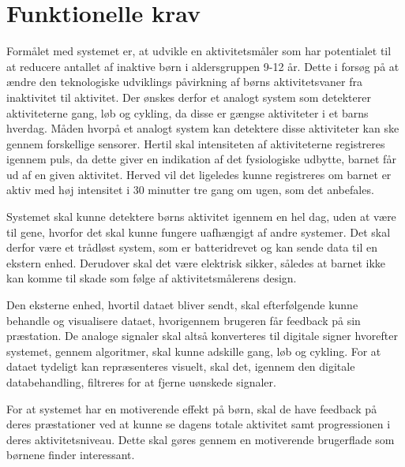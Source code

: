 \section{Funktionelle krav}



Formålet med systemet er, at udvikle en aktivitetsmåler som har potentialet til at reducere antallet af inaktive børn i aldersgruppen 9-12 år. Dette i forsøg på at ændre den teknologiske udviklings påvirkning af børns aktivitetsvaner fra inaktivitet til aktivitet.
Der ønskes derfor et analogt system som detekterer aktiviteterne gang, løb og cykling, da disse er gængse aktiviteter i et barns hverdag. Måden hvorpå et analogt system kan detektere disse aktiviteter kan ske gennem forskellige sensorer.
Hertil skal intensiteten af aktiviteterne registreres igennem puls, da dette giver en indikation af det fysiologiske udbytte, barnet får ud af en given aktivitet. Herved vil det ligeledes kunne registreres om barnet er aktiv med høj intensitet i 30 minutter tre gang om ugen, som det anbefales.

Systemet skal kunne detektere børns aktivitet igennem en hel dag, uden at være til gene, hvorfor det skal kunne fungere uafhængigt af andre systemer. Det skal derfor være et trådløst system, som er batteridrevet og kan sende data til en ekstern enhed. Derudover skal det være elektrisk sikker, således at barnet ikke kan komme til skade som følge af aktivitetsmålerens design. 

Den eksterne enhed, hvortil dataet bliver sendt, skal efterfølgende kunne behandle og visualisere dataet, hvorigennem brugeren får feedback på sin præstation. De analoge signaler skal altså konverteres til digitale signer hvorefter systemet, gennem algoritmer, skal kunne adskille gang, løb og cykling. For at dataet tydeligt kan repræsenteres visuelt, skal det, igennem den digitale databehandling, filtreres for at fjerne uønskede signaler. 

For at systemet har en motiverende effekt på børn, skal de have feedback på deres præstationer ved at kunne se dagens totale aktivitet samt progressionen i deres aktivitetsniveau. Dette skal gøres gennem en motiverende brugerflade som børnene finder interessant. 


